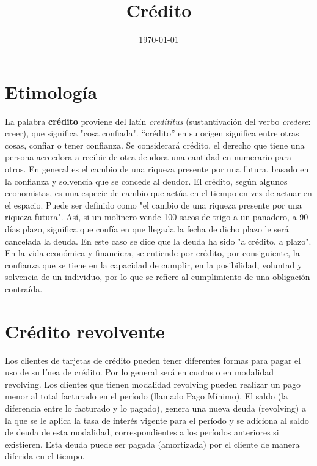 \documentclass[letterpaper,11pt]{article}
\title{Cr\'edito}
\date{\today{}}
\begin{document}
\maketitle

\section{Etimología}

La palabra \textbf{crédito} proviene del latín \textit{credititus} (sustantivación del verbo \textit{credere}: creer), que significa "cosa confiada". ``crédito'' en su origen significa entre otras cosas, confiar o tener confianza. Se considerará crédito, el derecho que tiene una persona acreedora a recibir de otra deudora una cantidad en numerario para otros. En general es el cambio de una riqueza presente por una futura, basado en la confianza y solvencia que se concede al deudor. El crédito, según algunos economistas, es una especie de cambio que actúa en el tiempo en vez de actuar en el espacio. Puede ser definido como "el cambio de una riqueza presente por una riqueza futura". Así, si un molinero vende 100 sacos de trigo a un panadero, a 90 días plazo, significa que confía en que llegada la fecha de dicho plazo le será cancelada la deuda. En este caso se dice que la deuda ha sido "a crédito, a plazo". En la vida económica y financiera, se entiende por crédito, por consiguiente, la confianza que se tiene en la capacidad de cumplir, en la posibilidad, voluntad y solvencia de un individuo, por lo que se refiere al cumplimiento de una obligación contraída.

\section{Crédito revolvente}

Los clientes de tarjetas de crédito pueden tener diferentes formas para pagar el uso de su línea de crédito. Por lo general será en cuotas o en modalidad revolving. Los clientes que tienen modalidad revolving pueden realizar un pago menor al total facturado en el período (llamado Pago Mínimo). El saldo (la diferencia entre lo facturado y lo pagado), genera una nueva deuda (revolving) a la que se le aplica la tasa de interés vigente para el período y se adiciona al saldo de deuda de esta modalidad, correspondientes a los períodos anteriores si existieren. Esta deuda puede ser pagada (amortizada) por el cliente de manera diferida en el tiempo.
\end{document}
